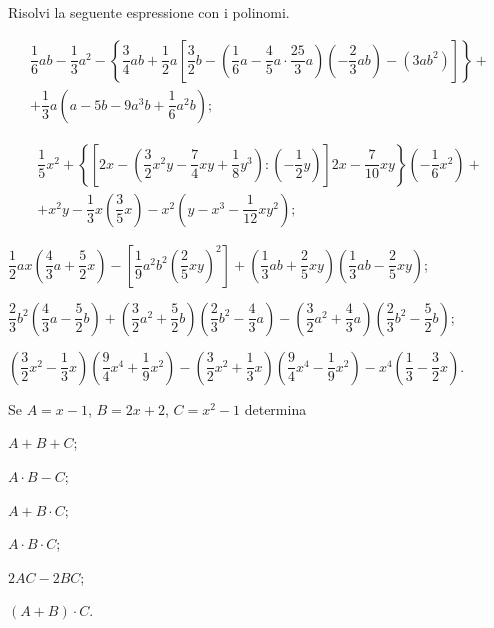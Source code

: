 \begin{esercizio}[\Ast]
\label{ese:11.52} %
Risolvi la seguente espressione con i polinomi.
\begin{enumeratea}
 \item
 \begin{multline*}
 \dfrac{1}{6}ab-\dfrac{1}{3}a^{2}-\left\{\dfrac{3}{4}ab+\dfrac{1}{2}a\left[\dfrac{3}{2}b-\left(\dfrac{1}{6}a-\dfrac{4}{5}a\cdot {\dfrac{25}{3}a}\right)\left(-{\dfrac{2}{3}ab}\right)-\left(3ab^{2}\right)\right]\right\}+\\
 +\dfrac{1}{3}a\left(a-5b-9a^{3}b+\dfrac{1}{6}a^{2}b\right);
 \end{multline*}
 \item
 \begin{multline*}
 \dfrac{1}{5}x^{2}+\left\{\left[2x-\left(\dfrac{3}{2}x^{2}y-\dfrac{7}{4}xy+\dfrac{1}{8}y^{3}\right):\left(-{\dfrac{1}{2}y}\right)\right] 2x-\dfrac{7}{10}xy\right\}\left(-{\dfrac{1}{6}x^{2}}\right)+\\
 +x^{2}y-\dfrac{1}{3}x\left(\dfrac{3}{5}x\right)-x^{2}\left(y-x^{3}-\dfrac{1}{12}xy^{2}\right);
 \end{multline*}
 \item $\dfrac{1}{2}ax\left(\dfrac{4}{3}a+\dfrac{5}{2}x\right)-\left[\dfrac{1}{9}a^{2}b^{2}\left(\dfrac{2}{5}xy\right)^2\right]+\left(\dfrac{1}{3}ab+\dfrac{2}{5}xy\right)\left(\dfrac{1}{3}ab-\dfrac{2}{5}xy\right)$;
 \item $\dfrac{2}{3}b^{2}\left(\dfrac{4}{3}a-\dfrac{5}{2}b\right)+\left(\dfrac{3}{2}a^{2}+\dfrac{5}{2}b\right)\left(\dfrac{2}{3}b^{2}-\dfrac{4}{3}a\right)-\left(\dfrac{3}{2}a^{2}+\dfrac{4}{3}a\right)\left(\dfrac{2}{3}b^{2}-\dfrac{5}{2}b\right)$;
 \item $\left(\dfrac{3}{2}x^{2}-\dfrac{1}{3}x\right)\left(\dfrac{9}{4}x^{4}+\dfrac{1}{9}x^{2}\right)-\left(\dfrac{3}{2}x^{2}+\dfrac{1}{3}x\right)\left(\dfrac{9}{4}x^{4}-\dfrac{1}{9}x^{2}\right)-x^{4}\left(\dfrac{1}{3}-\dfrac{3}{2}x\right)$.
\end{enumeratea}
\end{esercizio}
\pagebreak
\begin{esercizio}
\label{ese:11.53}
Se $A=x-1$, $B=2x+2$, $C=x^2-1$ determina
\begin{multicols}{3}
\begin{enumeratea}
\item $A+B+C$;
\item $A\cdot B-C$;
\item $A+B\cdot C$;
\item $A\cdot B\cdot C$;
\item $2AC-2BC$;
\item $(A+B)\cdot C$.
\end{enumeratea}
\end{multicols}
\end{esercizio}


